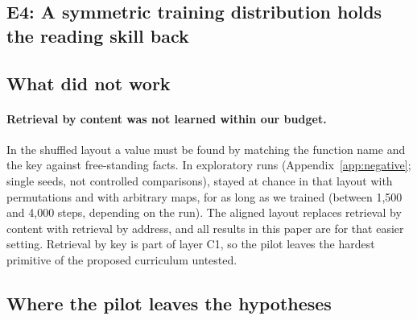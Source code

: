 

\subsection{E4: A symmetric training distribution holds the reading skill back}
\label{sec:symmetry}



\subsection{What did not work}
\label{sec:negative}

\paragraph{Retrieval by content was not learned within our budget.}
In the shuffled layout a value must be found by matching the function name and the key against free-standing facts.
In exploratory runs (Appendix~\ref{app:negative}; single seeds, not controlled comparisons),  stayed at chance in that layout with permutations and with arbitrary maps, for as long as we trained (between 1{,}500 and 4{,}000 steps, depending on the run).
The aligned layout replaces retrieval by content with retrieval by address, and all results in this paper are for that easier setting.
Retrieval by key is part of layer C1, so the pilot leaves the hardest primitive of the proposed curriculum untested.

\subsection{Where the pilot leaves the hypotheses}


